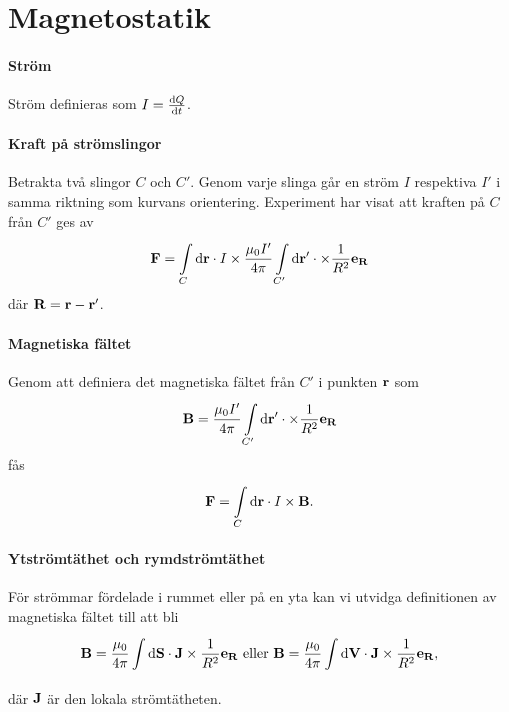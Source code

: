 \section{Magnetostatik}

\paragraph{Ström}
Ström definieras som $I = \dv{Q}{t}$.

\paragraph{Kraft på strömslingor}
Betrakta två slingor $C$ och $C'$. Genom varje slinga går en ström $I$ respektiva $I'$ i samma riktning som kurvans orientering. Experiment har visat att kraften på $C$ från $C'$ ges av
\begin{align*}
	\vb{F} = \int\limits_{C}^{}\dd{\vb{\vb{r}}}\cdot I\times\frac{\mu_{0}I'}{4\pi}\int\limits_{C'}^{}\dd{\vb{\vb{r}'}}\cdot \times\frac{1}{R^{2}}\vb{e}_{\vb{R}}
\end{align*}
där $\vb{R} = \vb{r} - \vb{r}'$.

\paragraph{Magnetiska fältet}
Genom att definiera det magnetiska fältet från $C'$ i punkten $\vb{r}$ som
\begin{align*}
	\vb{B} = \frac{\mu_{0}I'}{4\pi}\int\limits_{C'}^{}\dd{\vb{\vb{r}'}}\cdot \times\frac{1}{R^{2}}\vb{e}_{\vb{R}}
\end{align*}
fås
\begin{align*}
	\vb{F} = \int\limits_{C}^{}\dd{\vb{\vb{r}}}\cdot I\times\vb{B}.
\end{align*}

\paragraph{Ytströmtäthet och rymdströmtäthet}
För strömmar fördelade i rummet eller på en yta kan vi utvidga definitionen av magnetiska fältet till att bli
\begin{align*}
	\vb{B} = \frac{\mu_{0}}{4\pi}\vinteg{}{}{S}{\vb{J}\times\frac{1}{R^{2}}\ub{R}}\ \text{eller}\ \vb{B} = \frac{\mu_{0}}{4\pi}\vinteg{}{}{V}{\vb{J}\times\frac{1}{R^{2}}\ub{R}},
\end{align*}
där $\vb{J}$ är den lokala strömtätheten.